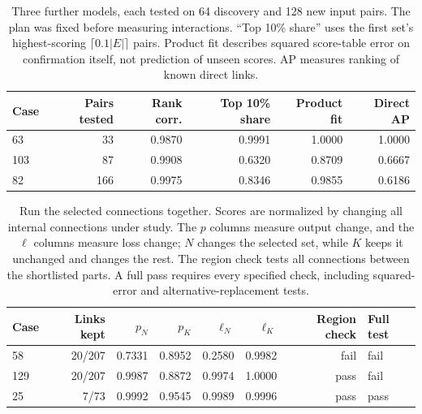 \documentclass[11pt,letterpaper]{article}
\begin{document}
\begin{table}[H]
\singlespacing\centering
\caption{Three further models, each tested on 64 discovery and 128 new input
pairs. The plan was fixed before measuring interactions. ``Top 10\% share''
uses the first set's highest-scoring $\lceil0.1|E|\rceil$ pairs. Product fit
describes squared score-table error on confirmation itself, not prediction of
unseen scores. AP measures ranking of known direct links.}
\label{tab:fresh}
\begin{tabular}{lrrrrr}
\toprule
Case & Pairs tested & Rank corr. & Top 10\% share & Product fit & Direct AP\\
\midrule
63  & 33  & 0.9870 & 0.9991 & 1.0000 & 1.0000\\
103 & 87  & 0.9908 & 0.6320 & 0.8709 & 0.6667\\
82  & 166 & 0.9975 & 0.8346 & 0.9855 & 0.6186\\
\bottomrule
\end{tabular}
\end{table}

\begin{table}[H]
\singlespacing\centering\small
\caption{Run the selected connections together. Scores are normalized by
changing all internal connections under study. The $p$ columns measure output
change, and the $\ell$ columns measure loss change; $N$ changes the selected
set, while $K$ keeps it unchanged and changes the rest. The region check tests
all connections between the shortlisted parts. A full pass requires every
specified check, including squared-error and alternative-replacement tests.}
\label{tab:sets}
\begin{tabular}{lrrrrrrl}
\toprule
Case & Links kept & $p_N$ & $p_K$ & $\ell_N$ & $\ell_K$ & Region check & Full test\\
\midrule
58  & 20/207 & 0.7331 & 0.8952 & 0.2580 & 0.9982 & fail & fail\\
129 & 20/207 & 0.9987 & 0.8872 & 0.9974 & 1.0000 & pass & fail\\
25  & 7/73   & 0.9992 & 0.9545 & 0.9989 & 0.9996 & pass & pass\\
\bottomrule
\end{tabular}
\end{table}
\end{document}

